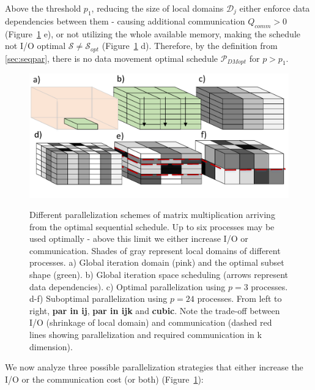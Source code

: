 \documentclass[sigplan,review,anonymous]{acmart}\settopmatter{printfolios=true,printccs=false,printacmref=false}
\begin{document}
Above the  
threshold $p_1$, reducing the size of 
local domains $\mathcal{D}_j$ either enforce data dependencies between them - 
causing
additional communication $Q_{comm} > 0$ (Figure~\ref{fig:mmmParallelization} 
e), or not 
utilizing the whole available memory, making the schedule not I/O optimal 
$\mathcal{S} \ne \mathcal{S}_{opt}$ 
(Figure~\ref{fig:mmmParallelization} d). Therefore, by the definition from  
\cref{sec:seqpar}, there is no data movement optimal schedule 
$\mathcal{P}_{DMopt}$ for $p > p_1$.

\begin{figure}
  \includegraphics[width=\columnwidth]{figures/mmm_parallelization}
  \label{fig:mmmParallelization}
  \caption{Different parallelization schemes of matrix multiplication 
    arriving from the optimal sequential schedule. Up to six processes may 
    be 
    used optimally - above this limit we either increase I/O or 
    communication. 
    Shades of gray represent local domains of different processes. a) 
    Global 
    iteration domain (pink) and the optimal subset shape (green). b) Global 
    iteration space scheduling (arrows represent data dependencies). c) 
    Optimal 
    parallelization using $p=3$ processes. d-f) Suboptimal parallelization 
    using $p=24$ processes. From left to right, \textbf{par in ij}, 
    \textbf{par 
      in ijk} and \textbf{cubic}. Note the trade-off between I/O 
      (shrinkage of 
    local domain) and communication (dashed red lines showing 
    parallelization 
    and required communication in k dimension).} 
\end{figure}

We now analyze three possible parallelization strategies that either increase 
the I/O or the communication cost (or both) 
(Figure~\ref{fig:mmmParallelization}):
\end{document}
